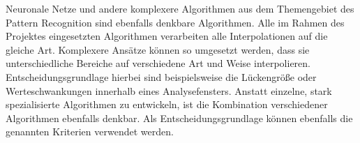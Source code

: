 Neuronale Netze und andere komplexere Algorithmen aus dem Themengebiet des Pattern Recognition sind ebenfalls denkbare Algorithmen. Alle im Rahmen des Projektes eingesetzten Algorithmen verarbeiten alle Interpolationen auf die gleiche Art. Komplexere Ansätze können so umgesetzt werden, dass sie unterschiedliche Bereiche auf verschiedene Art und Weise interpolieren. Entscheidungsgrundlage hierbei sind beispielsweise die Lückengröße oder Werteschwankungen innerhalb eines Analysefensters.
Anstatt einzelne, stark spezialisierte Algorithmen zu entwickeln, ist die Kombination verschiedener Algorithmen ebenfalls denkbar. Als Entscheidungsgrundlage können ebenfalls die genannten Kriterien verwendet werden.